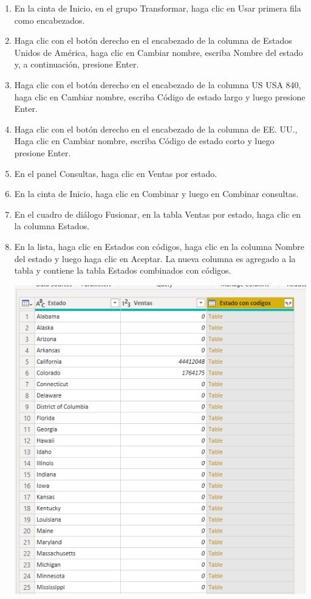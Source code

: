 \documentclass[12pt,letterpaper]{article}
\begin{document}
\begin{enumerate}
 
    \item En la cinta de Inicio, en el grupo Transformar, haga clic en Usar primera fila como encabezados.


    \item Haga clic con el botón derecho en el encabezado de la columna de Estados Unidos de América, haga clic en Cambiar nombre, escriba Nombre del estado y, a continuación, presione Enter.
    
    
    
    \item Haga clic con el botón derecho en el encabezado de la columna US USA 840, haga clic en Cambiar nombre, escriba Código de estado largo y luego presione Enter.
     
    \item Haga clic con el botón derecho en el encabezado de la columna de EE. UU., Haga clic en Cambiar nombre, escriba Código de estado corto y luego presione Enter.
    
    \item En el panel Consultas, haga clic en Ventas por estado.
    
    \item En la cinta de Inicio, haga clic en Combinar y luego en Combinar consultas.
    
    
    \item En el cuadro de diálogo Fusionar, en la tabla Ventas por estado, haga clic en la columna Estados.
    
    
    \item En la lista, haga clic en Estados con códigos, haga clic en la columna Nombre del estado y luego haga clic en Aceptar. La nueva columna es agregado a la tabla y contiene la tabla Estados combinados con códigos.
    \begin{center}
	\includegraphics[width=13cm]{./Imagenes/10}
	\end{center}



\end{enumerate}
\end{document}
